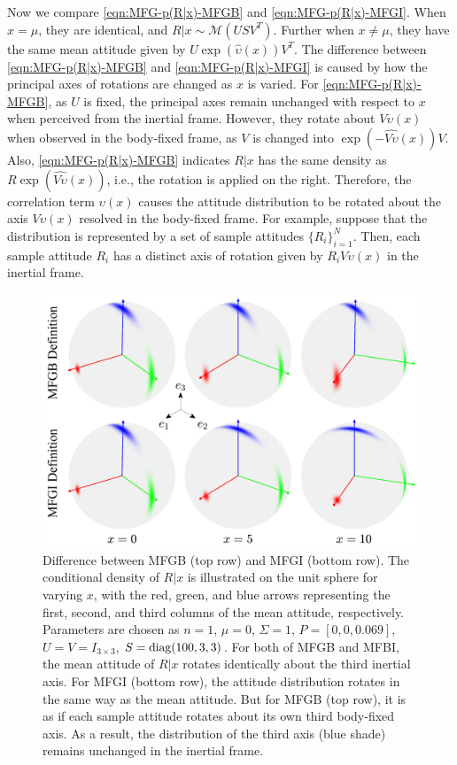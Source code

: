 Now we compare \eqref{eqn:MFG-p(R|x)-MFGB} and \eqref{eqn:MFG-p(R|x)-MFGI}.
When $x=\mu$, they are identical, and $R|x \sim \mathcal{M}(USV^T)$. 
Further when $x\neq \mu$, they have the same mean attitude given by $U\exp(\hat{\upsilon}(x))V^T$.
The difference between \eqref{eqn:MFG-p(R|x)-MFGB} and \eqref{eqn:MFG-p(R|x)-MFGI} is caused by how the principal axes of rotations are changed as $x$ is varied. 
For \eqref{eqn:MFG-p(R|x)-MFGB}, as $U$ is fixed, the principal axes remain unchanged with respect to $x$ when perceived from the inertial frame.
However, they rotate about $V\upsilon(x)$ when observed in the body-fixed frame, as $V$ is changed into $\exp(-\widehat{V\upsilon}(x))V$.
Also, \eqref{eqn:MFG-p(R|x)-MFGB} indicates $R|x$ has the same density as $R\exp(\widehat{V\upsilon}(x))$, i.e., the rotation is applied on the right.
Therefore, the correlation term $\upsilon(x)$ causes the attitude distribution to be rotated about the axis $V\upsilon(x)$ resolved in the body-fixed frame.
For example, suppose that the distribution is represented by a set of sample attitudes $\{R_i\}_{i=1}^N$. 
Then, each sample attitude $R_i$ has a distinct axis of rotation given by $R_i V\upsilon(x)$ in the inertial frame.

\begin{figure}
	\centering
	\includegraphics[scale=1.4]{figures/MFG-MFGI-MFGB}
	\caption[Difference between MFGB and MFGI.]{Difference between MFGB (top row) and MFGI (bottom row).
		The conditional density of $R|x$ is illustrated on the unit sphere for varying $x$, with the red, green, and blue arrows representing the first, second, and third columns of the mean attitude, respectively.
		Parameters are chosen as $n=1$, $\mu=0$, $\Sigma=1$, $P = [0,0,0.069]$, $U=V=I_{3\times 3}$, $S = \mathrm{diag}(100,3,3)$.
		For both of MFGB and MFBI, the mean attitude of $R|x$ rotates identically about the third inertial axis.
		For MFGI (bottom row), the attitude distribution rotates in the same way as the mean attitude. 
		But for MFGB (top row), it is as if each sample attitude rotates about its own third body-fixed axis. 
		As a result, the distribution of the third axis (blue shade) remains unchanged in the inertial frame. \label{fig:MFG-MFGI-MFGB}}
\end{figure}

